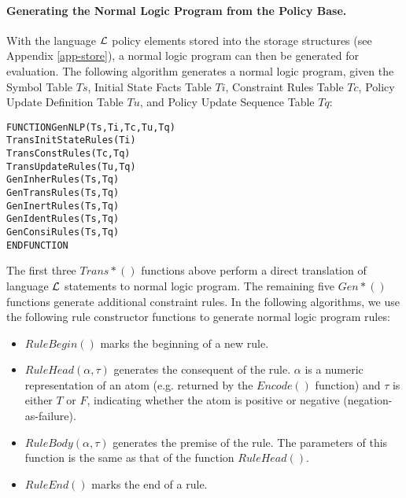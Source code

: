 \documentclass[glov2,twocolumn,final]{svjour2}
\newenvironment{vverbatim}
  {\begin{alltt}}
  {\vspace{-\baselineskip}\end{alltt}}
\begin{document}
        \paragraph{Generating the Normal Logic Program from the Policy Base.}

          With the language ${\cal L}$ policy elements stored into the storage
          structures (see Appendix \ref{app-store}), a normal logic program can
          then be generated for evaluation. The following algorithm generates
          a normal logic program, given the Symbol Table $Ts$, Initial
          State Facts Table $Ti$, Constraint Rules Table $Tc$, Policy
          Update Definition Table $Tu$, and Policy Update Sequence Table
          $Tq$:

          \begin{vverbatim}
FUNCTION GenNLP(Ts, Ti, Tc, Tu, Tq)
  TransInitStateRules(Ti)
  TransConstRules(Tc, Tq)
  TransUpdateRules(Tu, Tq)
  GenInherRules(Ts, Tq)
  GenTransRules(Ts, Tq)
  GenInertRules(Ts, Tq)
  GenIdentRules(Ts, Tq)
  GenConsiRules(Ts, Tq)
ENDFUNCTION
          \end{vverbatim}

          The first three $Trans*()$ functions above perform a direct
          translation of language ${\cal L}$ statements to normal logic
          program. The remaining five $Gen*()$ functions generate additional
          constraint rules. In the following algorithms, we use the following
          rule constructor functions to generate normal logic program rules:

          \begin{itemize}
            \item
              $RuleBegin()$ marks the beginning of a new rule.
            \item
              $RuleHead(\alpha, \tau)$ generates the consequent of the rule.
              $\alpha$ is a numeric representation of an atom (e.g. returned by
              the $Encode()$ function) and $\tau$ is either $T$ or $F$,
              indicating whether the atom is positive or negative
              (negation-as-failure).
            \item
              $RuleBody(\alpha, \tau)$ generates the premise of the rule. The
              parameters of this function is the same as that of the
              function $RuleHead()$.
            \item
              $RuleEnd()$ marks the end of a rule.
          \end{itemize}
\end{document}
